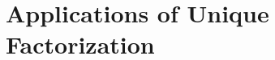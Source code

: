 \documentclass[../I&R.tex]{subfiles}
\begin{document}
\chapter{Applications of Unique Factorization}

\subsection*{}
\end{document}
